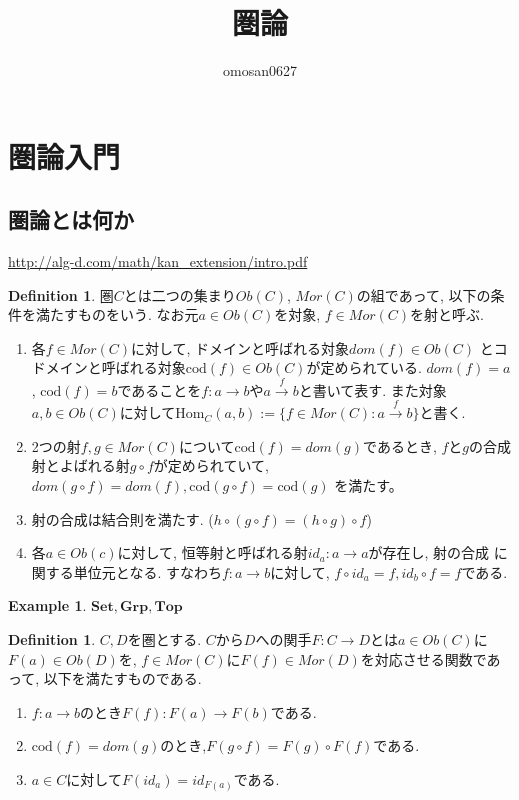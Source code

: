 \documentclass[a4paper,10pt]{article}
\title{圏論}
\author{omosan0627}
\theoremstyle{definition}
\newtheorem{definition}[thm]{\bfseries Definition}
\newtheorem{exmp}[thm]{\bfseries Example}
\begin{document}
\maketitle

\section{圏論入門}
\subsection{圏論とは何か}
\url{http://alg-d.com/math/kan_extension/intro.pdf}
\begin{definition}
    圏$C$とは二つの集まり$Ob(C)$, $Mor(C)$の組であって, 以下の条件を満たすものをいう. 
    なお元$a \in Ob(C)$を対象, $f \in Mor(C)$を射と呼ぶ.
    \begin{enumerate}[(1)]
        \item 各$f \in Mor(C)$に対して, ドメインと呼ばれる対象$dom(f)\in Ob(C)$
        とコドメインと呼ばれる対象$\mathrm{cod}(f) \in Ob(C)$が定められている.
        $dom(f) = a$, $\mathrm{cod}(f) = b$であることを$f:a \rightarrow b$や$a \xrightarrow{f} b$と書いて表す.
        また対象$a,b  \in Ob(C)$に対して$\mathrm{Hom}_C(a,b):=\{f \in Mor(C): a \xrightarrow{f} b\}$と書く.
        \item 2つの射$f,g \in Mor(C)$について$\mathrm{cod}(f) = dom(g)$であるとき, 
        $f$と$g$の合成射とよばれる射$g \circ f$が定められていて, $dom(g \circ f)=dom(f), \mathrm{cod}(g \circ f)=\mathrm{cod}(g)$
        を満たす。
        \item 射の合成は結合則を満たす. ($h \circ (g \circ f) = (h \circ g) \circ f$)
        \item 各$a \in Ob(c)$に対して, 恒等射と呼ばれる射$id_{a}:a \rightarrow a$が存在し, 射の合成
        に関する単位元となる. すなわち$f:a \rightarrow b$に対して, $f \circ id_a = f, id_b \circ f = f$である.
    \end{enumerate}
\end{definition}
\begin{exmp}
    $\mathbf{Set}, \mathbf{Grp}, \mathbf{Top}$
\end{exmp}
\begin{definition}
    $C,D$を圏とする. $C$から$D$への関手$F:C \rightarrow D$とは$a \in Ob(C)$に$F(a) \in Ob(D)$を, 
    $f \in Mor(C)$に$F(f) \in Mor(D)$を対応させる関数であって, 以下を満たすものである.
    \begin{enumerate}[(1)]
        \item $f: a \rightarrow b$のとき$F(f): F(a) \rightarrow F(b)$である.
        \item $\mathrm{cod}(f) = dom(g)$のとき,$F(g \circ f)= F(g) \circ F(f)$である.
        \item $a \in C$に対して$F(id_a) = id_{F(a)}$である.
    \end{enumerate}
\end{definition}
\end{document}
